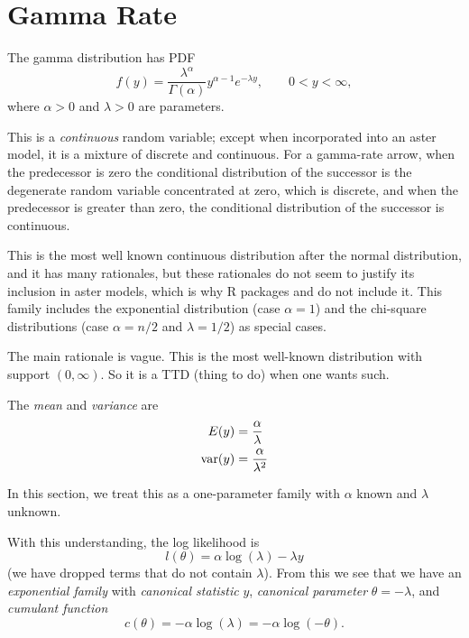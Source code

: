 \section{Gamma Rate}

The gamma distribution has PDF
\begin{equation} \label{eq:gamma-pdf}
   f(y) = \frac{\lambda^\alpha}{\Gamma(\alpha)} y^{\alpha - 1} e^{- \lambda y},
   \qquad 0 < y < \infty,
\end{equation}
where $\alpha > 0$ and $\lambda > 0$ are parameters.

This is a \emph{continuous} random variable;
except when incorporated into an aster model, it is a mixture of discrete
and continuous.  For a gamma-rate arrow, when the predecessor is zero
the conditional distribution of the successor is the degenerate random variable
concentrated at zero, which is discrete, and when the predecessor is greater
than zero, the conditional distribution of the successor is continuous.

This is the most well known continuous distribution after
the normal distribution, and it has many rationales, but these rationales
do not seem to justify its inclusion in aster models, which is why
R packages  and  do not include it.
This family includes the exponential distribution (case $\alpha = 1$)
and the chi-square distributions (case $\alpha = n / 2$ and $\lambda = 1 / 2$)
as special cases.

The main rationale is vague.  This is the most well-known distribution
with support $(0, \infty)$.  So it is a TTD (thing to do) when one wants such.

The \emph{mean} and \emph{variance} are
\begin{subequations}
\begin{align}
   E(y) & = \frac{\alpha}{\lambda}
   \label{eq:gamma-mean}
   \\
   \operatorname{var}(y) & = \frac{\alpha}{\lambda^2}
   \label{eq:gamma-var}
\end{align}
\end{subequations}

In this section, we treat this as a one-parameter family
with $\alpha$ known and $\lambda$ unknown.

With this understanding, the log likelihood is
$$
   l(\theta)
   = 
   \alpha \log(\lambda) - \lambda y
$$
(we have dropped terms that do not contain $\lambda$).
From this we see that we have an \emph{exponential family} with
\emph{canonical statistic} $y$,
\emph{canonical parameter} $\theta = - \lambda$, and
\emph{cumulant function}
\begin{equation} \label{eq:cumfun-gamma-rate}
   c(\theta) = - \alpha \log(\lambda) = - \alpha \log(- \theta).
\end{equation}

